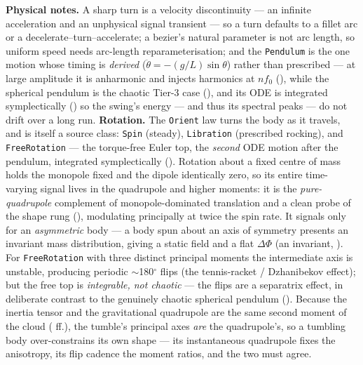 \documentclass[11pt,a4paper]{article}
\theoremstyle{reqstyle}
\begin{document}
\textbf{Physical notes.} A sharp turn is a velocity discontinuity --- an infinite
acceleration and an unphysical signal transient --- so a turn defaults to a fillet arc or a
decelerate--turn--accelerate; a bezier's natural parameter is not arc length, so uniform speed
needs arc-length reparameterisation; and the \texttt{Pendulum} is the one motion whose timing
is \emph{derived} ($\ddot\theta = -(g/L)\sin\theta$) rather than prescribed --- at large
amplitude it is anharmonic and injects harmonics at $n f_0$ (), while the
spherical pendulum is the chaotic Tier-3 case (), and its ODE is integrated
symplectically () so the swing's energy --- and thus its spectral peaks
--- do not drift over a long run. \textbf{Rotation.} The \texttt{Orient} law turns the body as it travels, and is itself a source
class: \texttt{Spin} (steady), \texttt{Libration} (prescribed rocking), and \texttt{FreeRotation}
--- the torque-free Euler top, the \emph{second} ODE motion after the pendulum, integrated
symplectically (). Rotation about a fixed centre of mass holds the monopole
fixed and the dipole identically zero, so its entire time-varying signal lives in the quadrupole
and higher moments: it is the \emph{pure-quadrupole} complement of monopole-dominated translation
and a clean probe of the shape rung (), modulating principally at twice the
spin rate. It signals only for an \emph{asymmetric} body --- a body spun about an axis of symmetry
presents an invariant mass distribution, giving a static field and a flat $\Delta\Phi$ (an
invariant, ). For \texttt{FreeRotation} with three distinct principal moments the
intermediate axis is unstable, producing periodic $\sim$180$^\circ$ flips (the tennis-racket /
Dzhanibekov effect); but the free top is \emph{integrable, not chaotic} --- the flips are a
separatrix effect, in deliberate contrast to the genuinely chaotic spherical pendulum
(). Because the inertia tensor and the gravitational quadrupole are the same
second moment of the cloud ( ff.), the tumble's principal axes \emph{are} the
quadrupole's, so a tumbling body over-constrains its own shape --- its instantaneous quadrupole
fixes the anisotropy, its flip cadence the moment ratios, and the two must agree.
\end{document}
